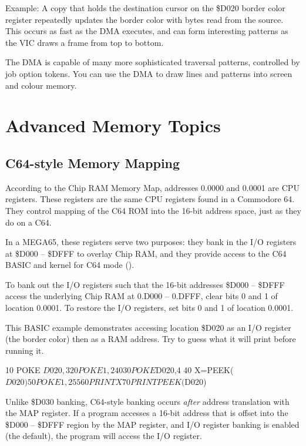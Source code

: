 Example: A copy that holds the destination cursor on the \$D020 border color
register repeatedly updates the border color with bytes read from the source.
This occurs as fast as the DMA executes, and can form interesting patterns as
the VIC draws a frame from top to bottom.

The DMA is capable of many more sophisticated traversal patterns, controlled by
job option tokens. You can use the DMA to draw lines and patterns into screen
and colour memory.


\newpage
\section{Advanced Memory Topics}

\subsection{C64-style Memory Mapping}

According to the Chip RAM Memory Map, addresses 0.0000 and 0.0001 are CPU
registers. These registers are the same CPU registers found in a Commodore 64.
They control mapping of the C64 ROM into the 16-bit address space, just as they
do on a C64.

In a MEGA65, these registers serve two purposes: they bank in the I/O registers
at \$D000 -- \$DFFF to overlay Chip RAM, and they provide access to the C64
BASIC and kernel for C64 mode ().

To bank out the I/O registers such that the 16-bit addresses \$D000 -- \$DFFF
access the underlying Chip RAM at 0.D000 -- 0.DFFF, clear bits 0 and 1 of
location 0.0001. To restore the I/O registers, set bits 0 and 1 of location
0.0001.

This BASIC example demonstrates accessing location \$D020 as an I/O register
(the border color) then as a RAM address. Try to guess what it will print
before running it.

\begin{screenoutput}
10 POKE $D020,3
20 POKE 1,240
30 POKE $D020,4
40 X=PEEK($D020)
50 POKE 1,255
60 PRINT X
70 PRINT PEEK($D020)
\end{screenoutput}

Unlike \$D030 banking, C64-style banking occurs {\em after} address translation
with the MAP register. If a program accesses a 16-bit address that is offset
into the \$D000 -- \$DFFF region by the MAP register, and I/O register banking
is enabled (the default), the program will access the I/O register.

